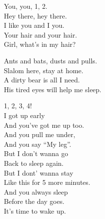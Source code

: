
\label{ep:teenage-gizzard}




You, you, 1, 2. \\

Hey there, hey there. \\
I like you and I  you. \\
Your hair and your hair. \\

Girl, what's in my hair? \\




Ants and bats, dusts and pulls. \\
Slalom here, stay at home. \\

A dirty bear is all I need. \\
His tired eyes will help me sleep. \\




1, 2, 3, 4! \\

I got up early \\
And you've got me up too. \\
And you pull me under, \\
And you say ``My leg''. \\

But I don't wanna go \\
Back to sleep again. \\
But I dont' wanna stay \\
Like this for 5 more minutes. \\

And you always sleep \\
Before the day goes. \\
It's time to wake up. \\

